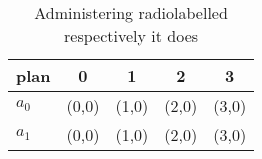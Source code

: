\documentclass[a4paper]{article}
\begin{document}
\begin{table}
\begin{adjustbox}{width=0.7\columnwidth}
\begin{tabular}{|l|l|l|l|l|}
\hline
\textbf{plan} & \multicolumn{1}{c|}{\textbf{0}} & \multicolumn{1}{c|}{\textbf{1}} & \multicolumn{1}{c|}{\textbf{2}} & \multicolumn{1}{c|}{\textbf{3}} \\ \hline
\textbf{$a_0$}  & (0,0) & (1,0) & (2,0) & (3,0) \\ \hline
\textbf{$a_1$}  & (0,0) & (1,0) & (2,0) & (3,0) \\ \hline
\end{tabular}
\end{adjustbox}
\caption{Administering radiolabelled respectively it does 
}
\end{table}
\end{document}
